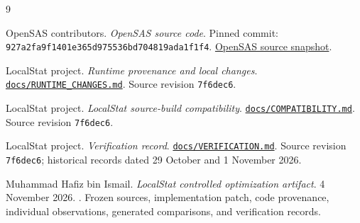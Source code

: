 \documentclass[11pt,a4paper]{article}
\newcommand{\localstatrevision}{7f6dec6537cc9e9ca9f9c37961b8b6811c5b7aff}
\begin{document}
\begin{thebibliography}{9}
\raggedright

OpenSAS contributors.
\emph{OpenSAS source code}.
Pinned commit:
\texttt{927a2fa9f1401e365d975536bd704819ada1f1f4}.
\href{https://github.com/kirha-ai/opensas/tree/927a2fa9f1401e365d975536bd704819ada1f1f4}{OpenSAS source snapshot}.

LocalStat project.
\emph{Runtime provenance and local changes}.
\href{https://github.com/hafiz122/localstat/blob/\localstatrevision/docs/RUNTIME_CHANGES.md}{\texttt{docs/RUNTIME\_CHANGES.md}}.
Source revision \texttt{7f6dec6}.

LocalStat project.
\emph{LocalStat source-build compatibility}.
\href{https://github.com/hafiz122/localstat/blob/\localstatrevision/docs/COMPATIBILITY.md}{\texttt{docs/COMPATIBILITY.md}}.
Source revision \texttt{7f6dec6}.

LocalStat project.
\emph{Verification record}.
\href{https://github.com/hafiz122/localstat/blob/\localstatrevision/docs/VERIFICATION.md}{\texttt{docs/VERIFICATION.md}}.
Source revision \texttt{7f6dec6}; historical records dated
29 October and 1 November 2026.

Muhammad Hafiz bin Ismail.
\emph{LocalStat controlled optimization artifact}.
4 November 2026.
.
Frozen sources, implementation patch, code provenance, individual
observations, generated comparisons, and verification records.

\end{thebibliography}
\end{document}
